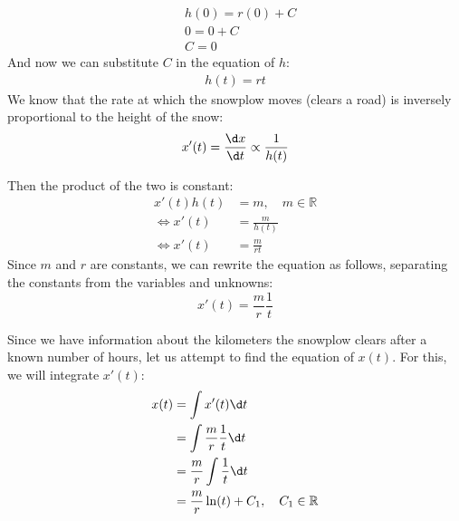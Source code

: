 \documentclass[a4paper,12pt]{article}
\begin{document}
    \begin{align*}
        &h(0) = r (0) + C \\
        &0 = 0 + C \\
        &\boxed{C = 0}
    \end{align*}
    And now we can substitute $C$ in the equation of $h$:
    \begin{align*}
        h(t) = rt 
    \end{align*}
    We know that the rate at which the snowplow moves (clears a road) is inversely proportional to the height of the snow:
    \begin{align*}
        x'(t) = \frac{\d x}{\d t} \propto \frac{1}{h(t)}
    \end{align*}
    
    Then the product of the two is constant:
    \begin{align*}
        x'(t) h(t) &= m, \quad m \in \mathbb{R} \\
        \iff x'(t) &= \frac{m}{h(t)} \\
        \iff x'(t) &= \frac{m}{rt}
    \end{align*}
    Since $m$ and $r$ are constants, we can rewrite the equation as follows, separating the constants from the variables and unknowns:
    \begin{equation*}
        x'(t) = \frac{m}{r} \frac{1}{t}
    \end{equation*}


    Since we have information about the kilometers the snowplow clears after a known number of hours, let us attempt to find the equation of $x(t)$. For this, we will integrate $x'(t)$:
    \begin{align*}
        x(t) &= \int x'(t) \d t \\ 
        &= \int \frac{m}{r} \frac{1}{t} \d t \\
        &= \frac{m}{r} \int \frac{1}{t} \d t \\
        &= \frac{m}{r} \ln(t) + C_1, \quad C_1 \in \mathbb{R}
    \end{align*}
    
\end{document}
